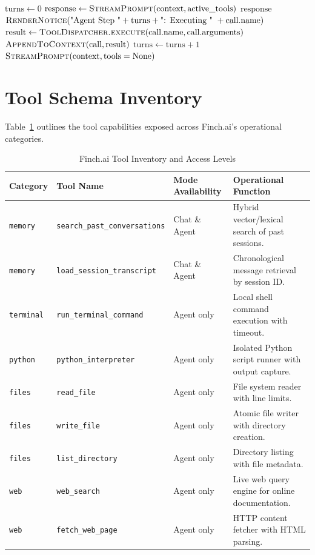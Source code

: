 \begin{algorithm}[H]
\caption{Sequential Multi-Turn Agent Loop}
\begin{algorithmic}[1]
\State $\text{turns} \gets 0$
    \State $\text{response} \gets \Call{StreamPrompt}{\text{context}, \text{active\_tools}}$
        \State \Return $\text{response}$ 
    \EndIf
        \State $\Call{RenderNotice}{\text{"Agent Step "} + \text{turns} + \text{": Executing " } + \text{call.name}}$
        \State $\text{result} \gets \Call{ToolDispatcher.execute}{\text{call.name}, \text{call.arguments}}$
        \State $\Call{AppendToContext}{\text{call}, \text{result}}$
    \EndFor
    \State $\text{turns} \gets \text{turns} + 1$
\EndWhile
\State \Return $\Call{StreamPrompt}{\text{context}, \text{tools}=\text{None}}$ 
\end{algorithmic}
\end{algorithm}

\section{Tool Schema Inventory}
Table~\ref{tab:tool_inventory} outlines the tool capabilities exposed across Finch.ai's operational categories.

\begin{table}[htbp]
\centering
\small
\begin{tabular}{lllp{6cm}}
\toprule
\textbf{Category} & \textbf{Tool Name} & \textbf{Mode Availability} & \textbf{Operational Function} \\
\midrule
\texttt{memory} & \texttt{search\_past\_conversations} & Chat \& Agent & Hybrid vector/lexical search of past sessions. \\
\texttt{memory} & \texttt{load\_session\_transcript} & Chat \& Agent & Chronological message retrieval by session ID. \\
\texttt{terminal} & \texttt{run\_terminal\_command} & Agent only & Local shell command execution with timeout. \\
\texttt{python} & \texttt{python\_interpreter} & Agent only & Isolated Python script runner with output capture. \\
\texttt{files} & \texttt{read\_file} & Agent only & File system reader with line limits. \\
\texttt{files} & \texttt{write\_file} & Agent only & Atomic file writer with directory creation. \\
\texttt{files} & \texttt{list\_directory} & Agent only & Directory listing with file metadata. \\
\texttt{web} & \texttt{web\_search} & Agent only & Live web query engine for online documentation. \\
\texttt{web} & \texttt{fetch\_web\_page} & Agent only & HTTP content fetcher with HTML parsing. \\
\bottomrule
\end{tabular}
\caption{Finch.ai Tool Inventory and Access Levels}
\label{tab:tool_inventory}
\end{table}

